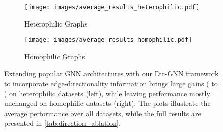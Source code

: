 \documentclass{article}
\newcommand\oursacro{Dir-GNN}
\theoremstyle{plain}
\theoremstyle{definition}
\theoremstyle{remark}
\begin{document}
\begin{figure}[t!]
\centering
\vspace{-7mm}
\begin{subfigure}[b]{0.4\textwidth}
     \centering
     \texttt{[image: images/average\_results\_heterophilic.pdf]}
     \caption{Heterophilic Graphs}
     \label{fig:aggregate_results_heterophilic}
\end{subfigure}
\begin{subfigure}[b]{0.375\textwidth}
     \centering
     \texttt{[image: images/average\_results\_homophilic.pdf]}
     \caption{Homophilic Graphs}
     \label{fig:aggregate_results_homophilic}
\end{subfigure}
\vspace{-1mm}
\caption{Extending popular GNN architectures with our \oursacro{} framework to incorporate edge-directionality information brings large gains ( to ) on heterophilic datasets (left), while leaving performance mostly unchanged on homophilic datasets (right). The plots illustrate the average performance over all datasets, while the full results are presented in \cref{tab:direction_ablation}.}
\label{fig:aggregate_results}
\vspace{-4mm}
\end{figure}
\end{document}
